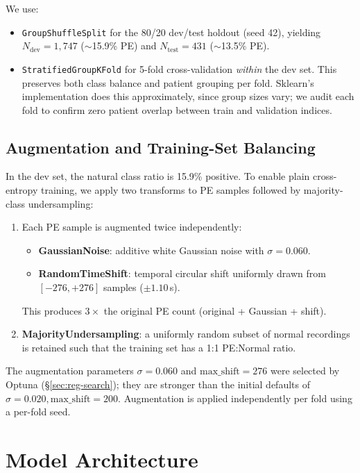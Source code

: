 \documentclass[11pt]{article}
\begin{document}
We use:
\begin{itemize}
\item \texttt{GroupShuffleSplit} for the 80/20 dev/test holdout (seed 42), yielding $N_\text{dev} = 1{,}747$ ($\sim$15.9\% PE) and $N_\text{test} = 431$ ($\sim$13.5\% PE).
\item \texttt{StratifiedGroupKFold} for 5-fold cross-validation \emph{within} the dev set. This preserves both class balance and patient grouping per fold. Sklearn's implementation does this approximately, since group sizes vary; we audit each fold to confirm zero patient overlap between train and validation indices.
\end{itemize}

\subsection{Augmentation and Training-Set Balancing}

In the dev set, the natural class ratio is 15.9\% positive. To enable plain cross-entropy training, we apply two transforms to PE samples followed by majority-class undersampling:
\begin{enumerate}
\item Each PE sample is augmented twice independently:
  \begin{itemize}
  \item \textbf{GaussianNoise}: additive white Gaussian noise with $\sigma = 0.060$.
  \item \textbf{RandomTimeShift}: temporal circular shift uniformly drawn from $[-276, +276]$ samples ($\pm 1.10$\,s).
  \end{itemize}
  This produces $3 \times$ the original PE count (original + Gaussian + shift).
\item \textbf{MajorityUndersampling}: a uniformly random subset of normal recordings is retained such that the training set has a 1:1 PE:Normal ratio.
\end{enumerate}

The augmentation parameters $\sigma = 0.060$ and $\text{max\_shift} = 276$ were selected by Optuna (\S\ref{sec:reg-search}); they are stronger than the initial defaults of $\sigma = 0.020, \text{max\_shift} = 200$. Augmentation is applied independently per fold using a per-fold seed.

\section{Model Architecture}
\end{document}
